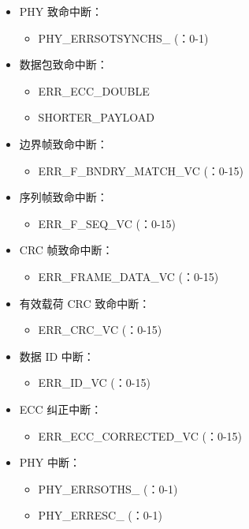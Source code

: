 \documentclass[main\_\_CN.tex]{subfiles}
\begin{document}
\begin{itemize}
    \item PHY 致命中断：
    \begin{itemize}
        \item PHY\_ERRSOTSYNCHS\_ (：0-1)
    \end{itemize}
    \item 数据包致命中断：
    \begin{itemize}
        \item ERR\_ECC\_DOUBLE
        \item SHORTER\_PAYLOAD
    \end{itemize}    
    \item 边界帧致命中断：
    \begin{itemize}
        \item ERR\_F\_BNDRY\_MATCH\_VC (：0-15)
    \end{itemize}        
    \item 序列帧致命中断：
    \begin{itemize}
        \item ERR\_F\_SEQ\_VC (：0-15)
    \end{itemize}   
    \item CRC 帧致命中断：
    \begin{itemize}
        \item ERR\_FRAME\_DATA\_VC (：0-15)
    \end{itemize}      
    \item 有效载荷 CRC 致命中断：
    \begin{itemize}
        \item ERR\_CRC\_VC (：0-15)
    \end{itemize}          
    \item 数据 ID 中断：
    \begin{itemize}
        \item ERR\_ID\_VC (：0-15)
    \end{itemize}         
    \item ECC 纠正中断：
    \begin{itemize}
        \item ERR\_ECC\_CORRECTED\_VC (：0-15)
    \end{itemize}
    \item PHY 中断：
    \begin{itemize}
        \item PHY\_ERRSOTHS\_ (：0-1)
        \item PHY\_ERRESC\_ (：0-1)
    \end{itemize}
\end{itemize}
\end{document}
